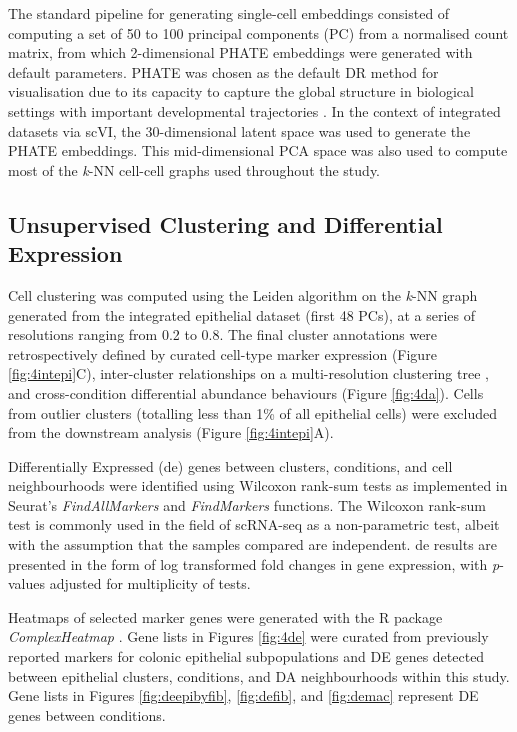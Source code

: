 The standard pipeline for generating single-cell embeddings consisted of computing a set of 50 to 100 principal components (PC) from a normalised count matrix, from which 2-dimensional PHATE embeddings were generated with default parameters. PHATE was chosen as the default DR method for visualisation due to its capacity to capture the global structure in biological settings with important developmental trajectories \cite{moon_visualizing_2019}. In the context of integrated datasets via scVI, the 30-dimensional latent space was used to generate the PHATE embeddings. 
This mid-dimensional PCA space was also used to compute most of the \emph{k}-NN cell-cell graphs used throughout the study. 


\subsection{Unsupervised Clustering and Differential Expression}

Cell clustering was computed using the Leiden algorithm on the \emph{k}-NN graph generated from the integrated epithelial dataset (first 48 PCs), at a series of resolutions ranging from 0.2 to 0.8. The final cluster annotations were retrospectively defined by curated cell-type marker expression (Figure \ref{fig:4intepi}C), inter-cluster relationships on a multi-resolution clustering tree \cite{zappia_clustering_2018}, and cross-condition differential abundance behaviours (Figure \ref{fig:4da}). Cells from outlier clusters (totalling less than 1\% of all epithelial cells) were excluded from the downstream analysis (Figure \ref{fig:4intepi}A).

Differentially Expressed (\acrshort{de}) genes between clusters, conditions, and cell neighbourhoods were identified using Wilcoxon rank-sum tests as implemented in Seurat's \textit{FindAllMarkers} and \textit{FindMarkers} functions. The Wilcoxon rank-sum test is commonly used in the field of scRNA-seq as a non-parametric test, albeit with the assumption that the samples compared are independent. \acrshort{de} results are presented in the form of log transformed fold changes in gene expression, with \emph{p}-values adjusted for multiplicity of tests.

Heatmaps of selected marker genes were generated with the R package \textit{ComplexHeatmap} \cite{gu_complex_2016}. Gene lists in Figures \ref{fig:4de} were curated from previously reported markers for colonic epithelial subpopulations and DE genes detected between epithelial clusters, conditions, and DA neighbourhoods within this study. Gene lists in Figures \ref{fig:deepibyfib}, \ref{fig:defib}, and \ref{fig:demac} represent DE genes between conditions.

